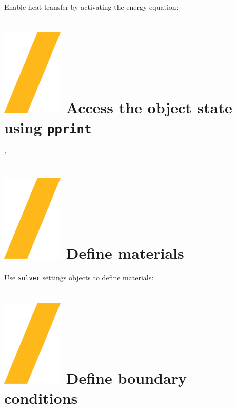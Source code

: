 \documentclass[9pt,landscape]{article}
\begin{document}
\begin{multicols}{3}
Enable heat transfer by activating the energy equation:


\section{\includegraphics[height=\fontcharht\font`\S]{slash.png} Access the object state using \texttt{pprint}}:



\vfill
\section{\includegraphics[height=\fontcharht\font`\S]{slash.png}  Define materials}
Use \texttt{solver} settings objects to define materials:

\section{\includegraphics[height=\fontcharht\font`\S]{slash.png}  Define boundary conditions}


\end{multicols}
\end{document}
